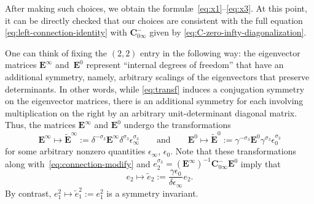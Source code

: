 \documentclass[11pt]{article}
\numberwithin{equation}{section}
\numberwithin{equation}{section}
\begin{document}
After making such choices, we obtain the formul\ae\ \eqref{eq:x1}--\eqref{eq:x3}. At this point, it can be directly checked that our choices are consistent with the full equation \eqref{eq:left-connection-identity} with $\mathbf C_{0\infty}^-$ given by \eqref{eq:C-zero-infty-diagonalization}.

One can think of fixing the $(2,2)$ entry in the following way: the eigenvector matrices $\mathbf{E}^\infty$ and~$\mathbf{E}^0$ represent ``internal degrees of freedom'' that have an additional symmetry, namely, arbitrary scalings of the eigenvectors that preserve determinants. In other words, while \eqref{eq:transf} induces a conjugation symmetry on the eigenvector matrices, there is an additional symmetry for each involving multiplication on the right by an arbitrary unit-determinant diagonal matrix. Thus, the matrices $\mathbf{E}^\infty$ and $\mathbf{E}^0$ undergo the transformations
 \begin{equation*}
 \mathbf{E}^{\infty}\mapsto \widetilde{\mathbf{E}}^\infty:=\delta^{-\sigma_3}\mathbf{E}^\infty\delta^{\sigma_3}\epsilon_\infty^{\sigma_3}\qquad\text{and}\qquad
 \mathbf{E}^{0}\mapsto \widetilde{\mathbf{E}}^0:=\gamma^{-\sigma_3}\mathbf{E}^0\gamma^{\sigma_3}\epsilon_0^{\sigma_3}
 \end{equation*}
 for some arbitrary nonzero quantities $\epsilon_\infty$, $\epsilon_0$. Note that these transformations along with~\eqref{eq:connection-modify} and $e_2^{\sigma_3}=(\mathbf{E}^\infty)^{-1}\mathbf{C}_{0\infty}^-\mathbf{E}^0$ imply that
 \begin{equation*}
 e_2\mapsto\widetilde{e}_2:=\frac{\gamma\epsilon_0}{\delta\epsilon_\infty}e_2.
 \end{equation*}
 By contrast, $e_1^2\mapsto\widetilde{e}_1^2:=e_1^2$ is a symmetry invariant.
\end{document}
